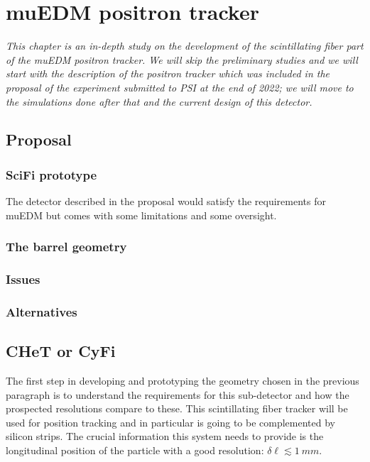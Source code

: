\chapter{muEDM positron tracker}
\begin{refsection}
{\itshape This chapter is an in-depth study on the development of the scintillating fiber part of the muEDM positron tracker. 
We will skip the preliminary studies and we will start with the description of the positron tracker which was included in the proposal of the experiment submitted to PSI at the end of 2022; we will move to the simulations done after that and the current design of this detector.}

\section{Proposal}
    \subsection{SciFi prototype}
        The detector described in the proposal would satisfy the requirements for muEDM but comes with some limitations and some oversight.
    \subsection{The barrel geometry}
    \subsection{Issues}
    \subsection{Alternatives}

    \section{CHeT or CyFi}
        The first step in developing and prototyping the geometry chosen in the previous paragraph is to understand the requirements for this sub-detector and how the prospected resolutions compare to these.
        This scintillating fiber tracker will be used for position tracking and in particular is going to be complemented by silicon strips. The crucial information this system needs to provide is the longitudinal position of the particle with a good resolution: $\delta \ell \lesssim \SI{1}{mm}$.


\end{refsection}
